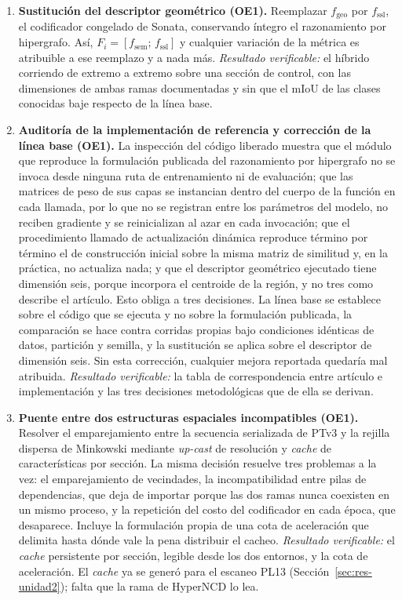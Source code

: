 \begin{enumerate}
\item[\textbf{A1}] \textbf{Sustitución del descriptor geométrico (OE1).} Reemplazar $f_{\text{geo}}$ por
$f_{\mathrm{ssl}}$, el codificador congelado de Sonata, conservando íntegro el
razonamiento por hipergrafo. Así,
$F_i = [f_{\mathrm{sem}};\, f_{\mathrm{ssl}}]$ y cualquier variación de
la métrica es atribuible a ese reemplazo y a nada más.
\emph{Resultado verificable:} el híbrido corriendo de extremo a extremo sobre una
sección de control, con las dimensiones de ambas ramas documentadas y sin que el
mIoU de las clases conocidas baje respecto de la línea base.

\item[\textbf{A2}] \textbf{Auditoría de la implementación de referencia y
corrección de la línea base (OE1).} La inspección del código liberado muestra
que el módulo que reproduce la formulación publicada del razonamiento por
hipergrafo no se invoca desde ninguna ruta de entrenamiento ni de evaluación;
que las matrices de peso de sus capas se instancian dentro del cuerpo de la
función en cada llamada, por lo que no se registran entre los parámetros del
modelo, no reciben gradiente y se reinicializan al azar en cada invocación; que
el procedimiento llamado de actualización dinámica reproduce término por término
el de construcción inicial sobre la misma matriz de similitud y, en la práctica, no
actualiza nada; y que el descriptor geométrico ejecutado tiene dimensión seis,
porque incorpora el centroide de la región, y no tres como describe el artículo.
Esto obliga a tres decisiones. La línea base se establece sobre el código que se
ejecuta y no sobre la formulación publicada, la comparación se hace contra
corridas propias bajo condiciones idénticas de datos, partición y semilla, y la
sustitución se aplica sobre el descriptor de dimensión seis. Sin esta corrección,
cualquier mejora reportada quedaría mal atribuida. \emph{Resultado verificable:}
la tabla de correspondencia entre artículo e implementación y las tres decisiones
metodológicas que de ella se derivan.

\item[\textbf{A4}] \textbf{Puente entre dos estructuras espaciales incompatibles
(OE1).} Resolver el emparejamiento entre la secuencia serializada de PTv3 y la
rejilla dispersa de Minkowski mediante \emph{up-cast} de resolución y
\emph{cache} de características por sección. La misma decisión resuelve tres
problemas a la vez: el emparejamiento de vecindades, la incompatibilidad entre
pilas de dependencias, que deja de importar porque las dos ramas nunca coexisten
en un mismo proceso, y la repetición del costo del codificador en cada época, que
desaparece. Incluye la formulación propia de una cota de aceleración que delimita
hasta dónde vale la pena distribuir el cacheo. \emph{Resultado verificable:} el
\emph{cache} persistente por sección, legible desde los dos entornos, y la cota
de aceleración. El \emph{cache} ya se generó para el escaneo PL13
(Sección~\ref{sec:res-unidad2}); falta que la rama de HyperNCD lo lea.
\end{enumerate}

